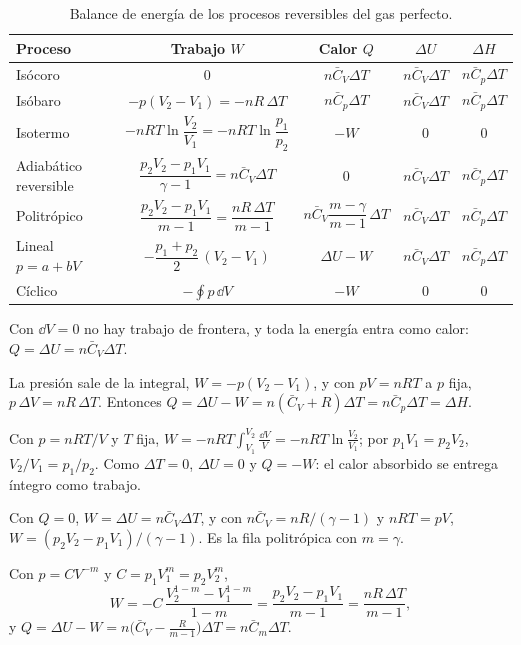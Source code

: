 \documentclass[11pt,a4paper]{article}
\newcommand{\Cv}{\bar C_V}
\newcommand{\Cp}{\bar C_p}
\begin{document}
\begin{table}[htbp]
\centering
\caption{Balance de energía de los procesos reversibles del gas perfecto.}
\label{tab:energia}
\small
\renewcommand{\arraystretch}{1.9}
\begin{tabular}{lcccc}
\toprule
Proceso & Trabajo $W$ & Calor $Q$ & $\Delta U$ & $\Delta H$\\
\midrule
Isócoro & $0$ & $n\Cv\Delta T$ & $n\Cv\Delta T$ & $n\Cp\Delta T$\\
Isóbaro & $-p(V_2-V_1)=-nR\,\Delta T$ & $n\Cp\Delta T$ & $n\Cv\Delta T$ & $n\Cp\Delta T$\\
Isotermo & $-nRT\ln\dfrac{V_2}{V_1}=-nRT\ln\dfrac{p_1}{p_2}$ & $-W$ & $0$ & $0$\\
Adiabático reversible & $\dfrac{p_2V_2-p_1V_1}{\gamma-1}=n\Cv\Delta T$ & $0$ & $n\Cv\Delta T$ & $n\Cp\Delta T$\\
Politrópico & $\dfrac{p_2V_2-p_1V_1}{m-1}=\dfrac{nR\,\Delta T}{m-1}$ & $n\Cv\dfrac{m-\gamma}{m-1}\,\Delta T$ & $n\Cv\Delta T$ & $n\Cp\Delta T$\\
Lineal $p=a+bV$ & $-\dfrac{p_1+p_2}{2}\,(V_2-V_1)$ & $\Delta U-W$ & $n\Cv\Delta T$ & $n\Cp\Delta T$\\
Cíclico & $-\oint p\,\dd V$ & $-W$ & $0$ & $0$\\
\bottomrule
\end{tabular}
\end{table}

 Con $\dd V=0$ no hay trabajo de frontera, y toda la energía entra como calor:
$Q=\Delta U=n\Cv\Delta T$.

 La presión sale de la integral, $W=-p(V_2-V_1)$, y con $pV=nRT$ a $p$ fija,
$p\,\Delta V=nR\,\Delta T$. Entonces $Q=\Delta U-W=n(\Cv+R)\Delta T=n\Cp\Delta T=\Delta H$.

 Con $p=nRT/V$ y $T$ fija, $W=-nRT\int_{V_1}^{V_2}\frac{\dd V}{V}=-nRT\ln\frac{V_2}{V_1}$; por
$p_1V_1=p_2V_2$, $V_2/V_1=p_1/p_2$. Como $\Delta T=0$, $\Delta U=0$ y $Q=-W$: el calor absorbido se entrega
íntegro como trabajo.

 Con $Q=0$, $W=\Delta U=n\Cv\Delta T$, y con $n\Cv=nR/(\gamma-1)$ y $nRT=pV$,
$W=(p_2V_2-p_1V_1)/(\gamma-1)$. Es la fila politrópica con $m=\gamma$.

 Con $p=CV^{-m}$ y $C=p_1V_1^m=p_2V_2^m$,
\[
  W=-C\,\frac{V_2^{1-m}-V_1^{1-m}}{1-m}=\frac{p_2V_2-p_1V_1}{m-1}=\frac{nR\,\Delta T}{m-1},
\]
y $Q=\Delta U-W=n\bigl(\Cv-\tfrac{R}{m-1}\bigr)\Delta T=n\bar C_m\Delta T$.
\end{document}
